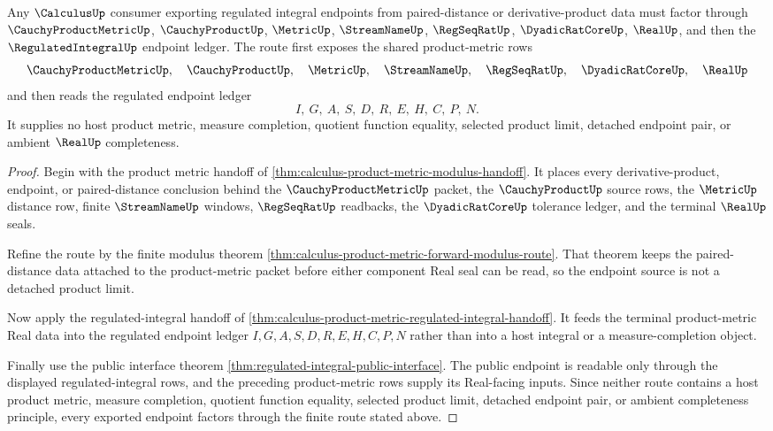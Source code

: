 \begin{theorem}
\label{thm:calculus-product-metric-regulated-endpoint-route}
Any $\CalculusUp$ consumer exporting regulated integral endpoints from paired-distance or derivative-product data must factor through $\CauchyProductMetricUp$, $\CauchyProductUp$, $\MetricUp$, $\StreamNameUp$, $\RegSeqRatUp$, $\DyadicRatCoreUp$, $\RealUp$, and then the $\RegulatedIntegralUp$ endpoint ledger. The route first exposes the shared product-metric rows
$$
\CauchyProductMetricUp,\quad
\CauchyProductUp,\quad
\MetricUp,\quad
\StreamNameUp,\quad
\RegSeqRatUp,\quad
\DyadicRatCoreUp,\quad
\RealUp
$$
and then reads the regulated endpoint ledger
$$
I,\ G,\ A,\ S,\ D,\ R,\ E,\ H,\ C,\ P,\ N .
$$
It supplies no host product metric, measure completion, quotient function equality, selected product limit, detached endpoint pair, or ambient $\RealUp$ completeness.
\end{theorem}
\begin{proof}
Begin with the product metric handoff of \autoref{thm:calculus-product-metric-modulus-handoff}. It places every derivative-product, endpoint, or paired-distance conclusion behind the $\CauchyProductMetricUp$ packet, the $\CauchyProductUp$ source rows, the $\MetricUp$ distance row, finite $\StreamNameUp$ windows, $\RegSeqRatUp$ readbacks, the $\DyadicRatCoreUp$ tolerance ledger, and the terminal $\RealUp$ seals.

Refine the route by the finite modulus theorem \autoref{thm:calculus-product-metric-forward-modulus-route}. That theorem keeps the paired-distance data attached to the product-metric packet before either component Real seal can be read, so the endpoint source is not a detached product limit.

Now apply the regulated-integral handoff of \autoref{thm:calculus-product-metric-regulated-integral-handoff}. It feeds the terminal product-metric Real data into the regulated endpoint ledger $I,G,A,S,D,R,E,H,C,P,N$ rather than into a host integral or a measure-completion object.

Finally use the public interface theorem \autoref{thm:regulated-integral-public-interface}. The public endpoint is readable only through the displayed regulated-integral rows, and the preceding product-metric rows supply its Real-facing inputs. Since neither route contains a host product metric, measure completion, quotient function equality, selected product limit, detached endpoint pair, or ambient completeness principle, every exported endpoint factors through the finite route stated above.
\end{proof}

